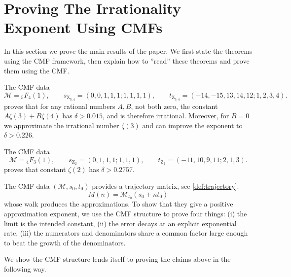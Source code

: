 \section{Proving The Irrationality Exponent Using CMFs}
\label{sec:proof_strategy}

In this section we prove the main results of the paper. We first state the theorems using the CMF framework, then explain how to ''read'' these theorems and prove them using the CMF.
\begin{theorem}
    \label{thm:cmf1}
    
    The CMF data
    \begin{equation*}
 \boxed{
 \mathcal M={}_5F_4(1),\qquad
 s_{\mathrm Z_{3,4}}=(0,0,1,1,1; 1,1,1,1),\qquad
 t_{\mathrm Z_{3,4}}=(-14,-15,13,14,12;1,2,3,4).
 }
\end{equation*}
    proves that for any rational numbers $A,B$, not both zero, the constant $A\zeta(3)+B\zeta(4)$ has $\delta>0.015$, and is therefore irrational. Moreover, for $B=0$ we approximate the irrational number $\zeta(3)$ and can improve the exponent to $\delta>0.226$.
\end{theorem}
\begin{theorem}
    \label{thm:cmf2}
    
    The CMF data
    \begin{equation*}
 \boxed{
 \mathcal M={}_4F_3(1),\qquad
 s_{\mathrm Z_{2}}=(0,1,1,1; 1,1,1),\qquad
 t_{\mathrm Z_{2}}=(-11,10,9,11;2,1,3).
 }
\end{equation*}
    proves that constant $\zeta(2)$ has $\delta>0.2757$.
\end{theorem}

The CMF data $(\mathcal M,s_0,t_0)$ provides a trajectory matrix, see \ref{def:trajectory}.
\[
M(n)=\mathcal M_{t_0}(s_0+nt_0)
\]
whose walk produces the approximations. To show that they give a positive approximation exponent, we use the CMF structure to prove four things: (i) the limit is the intended constant, (ii) the error decays at an explicit exponential rate, (iii) the numerators and denominators share a common factor large enough to beat the growth of the denominators.

We show the CMF structure lends itself to proving the claims above in the following way.

